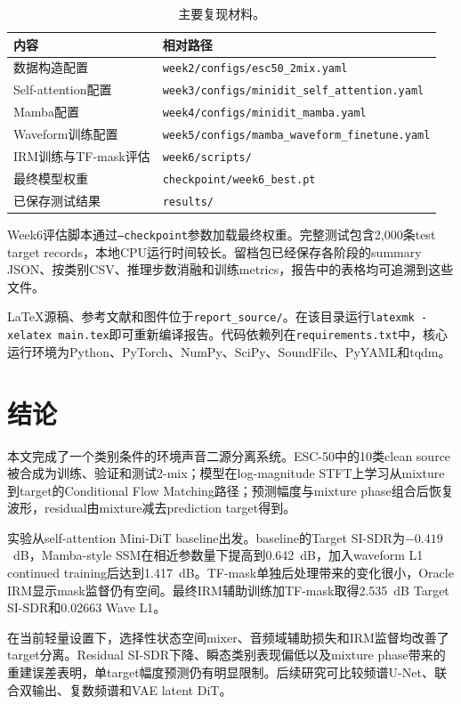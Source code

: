 \documentclass[UTF8,12pt,a4paper]{ctexart}
\newcommand{\code}[1]{\texttt{#1}}
\begin{document}
\begin{table}[H]
  \centering
  \caption{主要复现材料。}
  \label{tab:reproduce}
  \small
  \begin{tabularx}{0.95\textwidth}{p{4.0cm}X}
    \toprule
    内容 & 相对路径 \\
    \midrule
    数据构造配置 & \code{week2/configs/esc50\_2mix.yaml} \\
    Self-attention配置 & \code{week3/configs/minidit\_self\_attention.yaml} \\
    Mamba配置 & \code{week4/configs/minidit\_mamba.yaml} \\
    Waveform训练配置 & \code{week5/configs/mamba\_waveform\_finetune.yaml} \\
    IRM训练与TF-mask评估 & \code{week6/scripts/} \\
    最终模型权重 & \code{checkpoint/week6\_best.pt} \\
    已保存测试结果 & \code{results/} \\
    \bottomrule
  \end{tabularx}
\end{table}

Week6评估脚本通过\code{--checkpoint}参数加载最终权重。完整测试包含2,000条test target records，本地CPU运行时间较长。留档包已经保存各阶段的summary JSON、按类别CSV、推理步数消融和训练metrics，报告中的表格均可追溯到这些文件。

LaTeX源稿、参考文献和图件位于\code{report\_source/}。在该目录运行\code{latexmk -xelatex main.tex}即可重新编译报告。代码依赖列在\code{requirements.txt}中，核心运行环境为Python、PyTorch、NumPy、SciPy、SoundFile、PyYAML和tqdm。

\section{结论}

本文完成了一个类别条件的环境声音二源分离系统。ESC-50中的10类clean source被合成为训练、验证和测试2-mix；模型在log-magnitude STFT上学习从mixture到target的Conditional Flow Matching路径；预测幅度与mixture phase组合后恢复波形，residual由mixture减去prediction target得到。

实验从self-attention Mini-DiT baseline出发。baseline的Target SI-SDR为$-0.419$~dB，Mamba-style SSM在相近参数量下提高到0.642~dB，加入waveform L1 continued training后达到1.417~dB。TF-mask单独后处理带来的变化很小，Oracle IRM显示mask监督仍有空间。最终IRM辅助训练加TF-mask取得2.535~dB Target SI-SDR和0.02663 Wave L1。

在当前轻量设置下，选择性状态空间mixer、音频域辅助损失和IRM监督均改善了target分离。Residual SI-SDR下降、瞬态类别表现偏低以及mixture phase带来的重建误差表明，单target幅度预测仍有明显限制。后续研究可比较频谱U-Net、联合双输出、复数频谱和VAE latent DiT。
\end{document}
